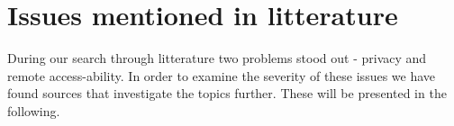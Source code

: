 \section{Issues mentioned in litterature}
During our search through litterature two problems stood out - privacy and remote access-ability.
In order to examine the severity of these issues we have found sources that investigate the topics further.
These will be presented in the following.

